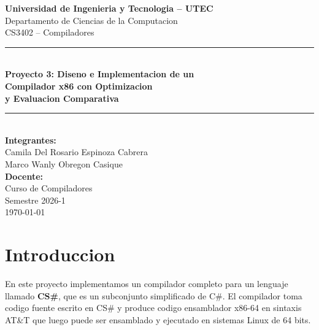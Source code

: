 \documentclass[12pt, a4paper]{article}
\begin{document}
\begin{titlepage}
    \centering
    \vspace*{1cm}

    {\Large \textbf{Universidad de Ingenieria y Tecnologia -- UTEC}}\\[0.4cm]
    {\large Departamento de Ciencias de la Computacion}\\[0.4cm]
    {\large CS3402 -- Compiladores}\\[1.5cm]

    \rule{\linewidth}{0.5mm}\\[0.6cm]
    {\LARGE \textbf{Proyecto 3: Diseno e Implementacion de un}}\\[0.3cm]
    {\LARGE \textbf{Compilador x86 con Optimizacion}}\\[0.3cm]
    {\LARGE \textbf{y Evaluacion Comparativa}}\\[0.3cm]
    \rule{\linewidth}{0.5mm}\\[2cm]

    {\large \textbf{Integrantes:}}\\[0.5cm]
    {\large Camila Del Rosario Espinoza Cabrera}\\[0.2cm]
    {\large Marco Wanly Obregon Casique}\\[2cm]

    {\large \textbf{Docente:}} \\[0.3cm]
    {\large Curso de Compiladores}\\[2cm]

    {\large Semestre 2026-1}\\[0.5cm]
    {\large \today}

    \vfill
\end{titlepage}

\tableofcontents
\newpage

\section{Introduccion}

En este proyecto implementamos un compilador completo para un lenguaje llamado \textbf{CS\#}, que es un subconjunto simplificado de C\#. El compilador toma codigo fuente escrito en CS\# y produce codigo ensamblador x86-64 en sintaxis AT\&T que luego puede ser ensamblado y ejecutado en sistemas Linux de 64 bits.
\end{document}
